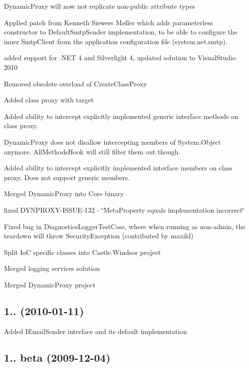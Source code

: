 \begin{DoxyItemize}
\item Dynamic\+Proxy will now not replicate non-\/public attribute types
\item Applied patch from Kenneth Siewers Møller which adds parameterless constructor to Default\+Smtp\+Sender implementation, to be able to configure the inner Smtp\+Client from the application configuration file (system.\+net.\+smtp).
\item added support for .N\+ET 4 and Silverlight 4, updated solution to Visual\+Studio 2010
\item Removed obsolete overload of Create\+Class\+Proxy
\item Added class proxy with target
\item Added ability to intercept explicitly implemented generic interface methods on class proxy.
\item Dynamic\+Proxy does not disallow intercepting members of System.\+Object anymore. All\+Methods\+Hook will still filter them out though.
\item Added ability to intercept explicitly implemented interface members on class proxy. Does not support generic members.
\item Merged Dynamic\+Proxy into Core binary
\item fixed D\+Y\+N\+P\+R\+O\+X\+Y-\/\+I\+S\+S\+U\+E-\/132 -\/ \char`\"{}\+Meta\+Property equals implementation incorrect\char`\"{}
\item Fixed bug in Diagnostics\+Logger\+Test\+Case, where when running as non-\/admin, the teardown will throw Security\+Exception (contributed by maxild)
\item Split IoC specific classes into Castle.\+Windsor project
\item Merged logging services solution
\item Merged Dynamic\+Proxy project
\end{DoxyItemize}

\subsection*{1.. (2010-\/01-\/11)}


\begin{DoxyItemize}
\item Added I\+Email\+Sender interface and its default implementation
\end{DoxyItemize}

\subsection*{1.. beta (2009-\/12-\/04)}


